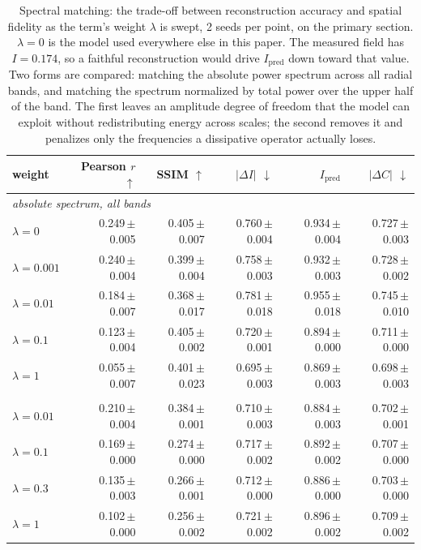 \begin{table}[htbp]
\centering
\small
\caption{Spectral matching: the trade-off between reconstruction accuracy and spatial fidelity as the term's weight $\lambda$ is swept, 2 seeds per point, on the primary section. $\lambda = 0$ is the model used everywhere else in this paper. The measured field has $I = 0.174$, so a faithful reconstruction would drive $I_{\mathrm{pred}}$ down toward that value. Two forms are compared: matching the absolute power spectrum across all radial bands, and matching the spectrum normalized by total power over the upper half of the band. The first leaves an amplitude degree of freedom that the model can exploit without redistributing energy across scales; the second removes it and penalizes only the frequencies a dissipative operator actually loses.}
\label{tab:spectral}
\begin{tabular}{lrrrrr}
\toprule
weight & Pearson $r$ $\uparrow$ & SSIM $\uparrow$ & $|\Delta I|$ $\downarrow$ & $I_{\mathrm{pred}}$ & $|\Delta C|$ $\downarrow$\\
\midrule
\multicolumn{6}{l}{\emph{absolute spectrum, all bands}} \\
\quad $\lambda = 0$ & 0.249\,\tiny{$\pm$ 0.005} & 0.405\,\tiny{$\pm$ 0.007} & 0.760\,\tiny{$\pm$ 0.004} & 0.934\,\tiny{$\pm$ 0.004} & 0.727\,\tiny{$\pm$ 0.003} \\
\quad $\lambda = 0.001$ & 0.240\,\tiny{$\pm$ 0.004} & 0.399\,\tiny{$\pm$ 0.004} & 0.758\,\tiny{$\pm$ 0.003} & 0.932\,\tiny{$\pm$ 0.003} & 0.728\,\tiny{$\pm$ 0.002} \\
\quad $\lambda = 0.01$ & 0.184\,\tiny{$\pm$ 0.007} & 0.368\,\tiny{$\pm$ 0.017} & 0.781\,\tiny{$\pm$ 0.018} & 0.955\,\tiny{$\pm$ 0.018} & 0.745\,\tiny{$\pm$ 0.010} \\
\quad $\lambda = 0.1$ & 0.123\,\tiny{$\pm$ 0.004} & 0.405\,\tiny{$\pm$ 0.002} & 0.720\,\tiny{$\pm$ 0.001} & 0.894\,\tiny{$\pm$ 0.000} & 0.711\,\tiny{$\pm$ 0.000} \\
\quad $\lambda = 1$ & 0.055\,\tiny{$\pm$ 0.007} & 0.401\,\tiny{$\pm$ 0.023} & 0.695\,\tiny{$\pm$ 0.003} & 0.869\,\tiny{$\pm$ 0.003} & 0.698\,\tiny{$\pm$ 0.003} \\
\addlinespace
\multicolumn{6}{l}{\emph{normalized spectrum, high band}} \\
\quad $\lambda = 0.01$ & 0.210\,\tiny{$\pm$ 0.004} & 0.384\,\tiny{$\pm$ 0.001} & 0.710\,\tiny{$\pm$ 0.003} & 0.884\,\tiny{$\pm$ 0.003} & 0.702\,\tiny{$\pm$ 0.001} \\
\quad $\lambda = 0.1$ & 0.169\,\tiny{$\pm$ 0.000} & 0.274\,\tiny{$\pm$ 0.000} & 0.717\,\tiny{$\pm$ 0.002} & 0.892\,\tiny{$\pm$ 0.002} & 0.707\,\tiny{$\pm$ 0.000} \\
\quad $\lambda = 0.3$ & 0.135\,\tiny{$\pm$ 0.003} & 0.266\,\tiny{$\pm$ 0.001} & 0.712\,\tiny{$\pm$ 0.000} & 0.886\,\tiny{$\pm$ 0.000} & 0.703\,\tiny{$\pm$ 0.000} \\
\quad $\lambda = 1$ & 0.102\,\tiny{$\pm$ 0.000} & 0.256\,\tiny{$\pm$ 0.002} & 0.721\,\tiny{$\pm$ 0.002} & 0.896\,\tiny{$\pm$ 0.002} & 0.709\,\tiny{$\pm$ 0.002} \\
\bottomrule
\end{tabular}
\end{table}
